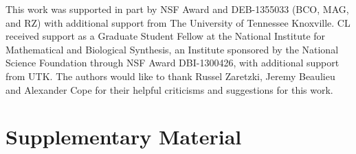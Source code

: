 \documentclass[12pt]{article}
\begin{document}
This work was supported in part by NSF Award and DEB-1355033 (BCO, MAG, and RZ) with additional support from The University of Tennessee Knoxville. 
CL received support as a Graduate Student Fellow at the National Institute for Mathematical and Biological Synthesis, an Institute sponsored by the National Science Foundation through NSF Award DBI-1300426, with additional support from UTK. 
The authors would like to thank Russel Zaretzki, Jeremy Beaulieu and Alexander Cope for their helpful criticisms and suggestions for this work.







\clearpage
\beginsupplement
\section*{Supplementary Material}
\end{document}
